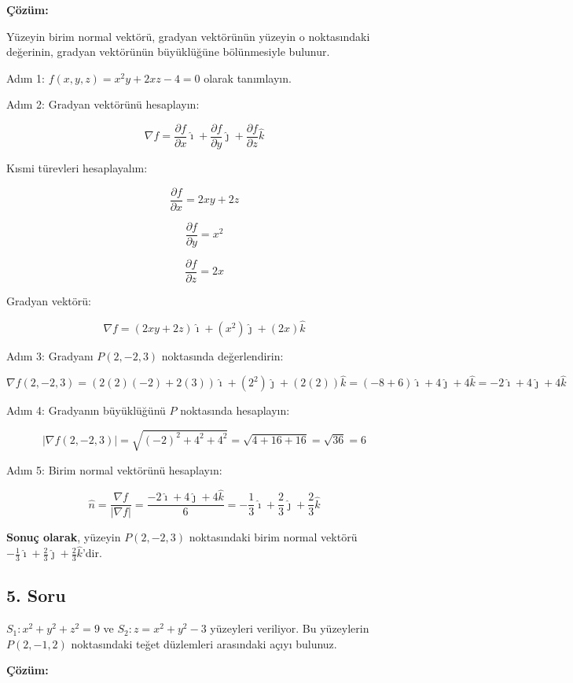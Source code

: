 \documentclass[]{fenbil}
\begin{document}
\textbf{Çözüm:}

Yüzeyin birim normal vektörü, gradyan vektörünün yüzeyin o noktasındaki değerinin, gradyan vektörünün büyüklüğüne bölünmesiyle bulunur.

Adım 1: $f(x, y, z) = x^2y + 2xz - 4 = 0$ olarak tanımlayın.

Adım 2: Gradyan vektörünü hesaplayın:

\[
\nabla f = \frac{\partial f}{\partial x}\hat{\imath} + \frac{\partial f}{\partial y}\hat{\jmath} + \frac{\partial f}{\partial z}\hat{k}
\]

Kısmi türevleri hesaplayalım:

\[
\frac{\partial f}{\partial x} = 2xy + 2z
\]

\[
\frac{\partial f}{\partial y} = x^2
\]

\[
\frac{\partial f}{\partial z} = 2x
\]

Gradyan vektörü:

\[
\nabla f = (2xy + 2z)\hat{\imath} + (x^2)\hat{\jmath} + (2x)\hat{k}
\]

Adım 3: Gradyanı $P(2, -2, 3)$ noktasında değerlendirin:

\[
\nabla f(2, -2, 3) = (2(2)(-2) + 2(3))\hat{\imath} + (2^2)\hat{\jmath} + (2(2))\hat{k} = (-8 + 6)\hat{\imath} + 4\hat{\jmath} + 4\hat{k} = -2\hat{\imath} + 4\hat{\jmath} + 4\hat{k}
\]

Adım 4: Gradyanın büyüklüğünü $P$ noktasında hesaplayın:

\[
|\nabla f(2, -2, 3)| = \sqrt{(-2)^2 + 4^2 + 4^2} = \sqrt{4 + 16 + 16} = \sqrt{36} = 6
\]

Adım 5: Birim normal vektörünü hesaplayın:

\[
\hat{n} = \frac{\nabla f}{|\nabla f|} = \frac{-2\hat{\imath} + 4\hat{\jmath} + 4\hat{k}}{6} = -\frac{1}{3}\hat{\imath} + \frac{2}{3}\hat{\jmath} + \frac{2}{3}\hat{k}
\]

\textbf{Sonuç olarak}, yüzeyin $P(2, -2, 3)$ noktasındaki birim normal vektörü $-\frac{1}{3}\hat{\imath} + \frac{2}{3}\hat{\jmath} + \frac{2}{3}\hat{k}$'dir.

\subsection*{5. Soru}

$S_1: x^2 + y^2 + z^2 = 9$ ve $S_2: z = x^2 + y^2 - 3$ yüzeyleri veriliyor. Bu yüzeylerin $P(2, -1, 2)$ noktasındaki teğet düzlemleri arasındaki açıyı bulunuz.

\textbf{Çözüm:}
\end{document}

